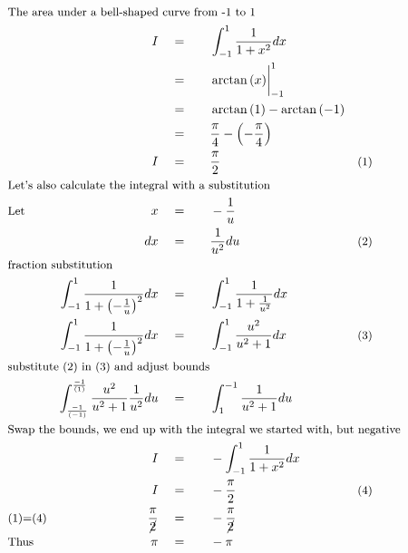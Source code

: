 \begin{alignat*}{5}
&\rlap{\small{\text{The area under a bell-shaped curve from -1 to 1}}}\\
&\,&I\quad&=\quad&&\int_{-1}^{1}\frac{1}{1+x^2}dx\\
&\,&\,&=&&\arctan{(x)}\bigg\vert_{-1}^{1}\\
&\,&\,&=&&\arctan{(1)}-\arctan{(-1)}\\
&\,&\,&=&&\frac{\pi}{4}-\left(-\frac{\pi}{4}\right)\\
&\,&I\quad&=&&\frac{\pi}{2}\quad&\small{\text{(1)}}\\
&\rlap{\small{\text{Let's also calculate the integral with a substitution}}}\\
&\small{\text{Let}}&x\quad&=&&-\frac{1}{u}\\
&\,&dx\quad&=&&\frac{1}{u^2}du\quad&\small{\text{(2)}}\\
&\rlap{\small{\text{fraction substitution}}}\\
&\,&\int_{-1}^{1}\frac{1}{1+\left(-\frac{1}{u}\right)^2}dx\quad&=&&\int_{-1}^{1}\frac{1}{1+\frac{1}{u^2}}dx\\
&\,&\int_{-1}^{1}\frac{1}{1+\left(-\frac{1}{u}\right)^2}dx\quad&=&&\int_{-1}^{1}\frac{u^2}{u^2+1}dx\quad&\small{\text{(3)}}\\
&\rlap{\small\text{substitute (2) in (3) and adjust bounds}}\\
&\,&\int_{\frac{-1}{(-1)}}^{\frac{-1}{(1)}}\frac{u^2}{u^2+1}\frac{1}{u^2}du\quad&=&&\int_{1}^{-1}\frac{1}{u^2+1}du\\
&\rlap{\small{\text{Swap the bounds, we end up with the integral we started with, but negative}}}\\
&\,&I\quad&=&&-\int_{-1}^{1}\frac{1}{1+x^2}dx\\
&\,&I\quad&=&&-\frac{\pi}{2}\quad&\small{\text{(4)}}\\
&\small{\text{(1)=(4)}}&\frac{\pi}{\cancel{2}}\quad&=&&-\frac{\pi}{\cancel{2}}\\
&\small{\text{Thus}}&\pi\quad&=&&-\pi\\
\end{alignat*}
